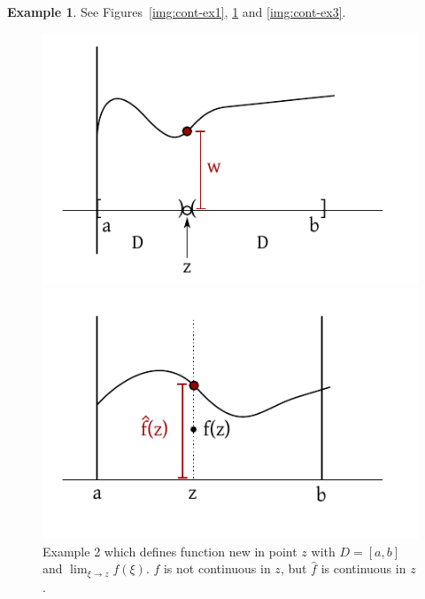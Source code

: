 \documentclass[a4paper,landscape,twocolumn]{article}
\theoremstyle{definition}
\newtheorem{ex}{Example}
\newcommand\set[1]{\left\{#1\right\}}
\begin{document}
\begin{ex}
  See Figures~\ref{img:cont-ex1}, \ref{img:cont-ex2} and \ref{img:cont-ex3}.
  \begin{figure}[p]
    \begin{center}
      \includegraphics{img/continuity_example_1.pdf}
      \caption{Example 1 with $D = [a, b] \setminus \set{z}$ and $w = \lim_{\xi \to z} f(\xi)$}
      \label{img:cont-ex1}
    \end{center}
    \begin{center}
      \includegraphics{img/continuity_example_2.pdf}
      \caption{
        Example 2 which defines function new in point $z$ with $D = [a,b]$ and $\lim_{\xi \to z} f(\xi)$.
        $f$ is not continuous in $z$, but $\hat{f}$ is continuous in $z$.
      }
      \label{img:cont-ex2}
    \end{center}
  \end{figure}
  \begin{figure}[p]
    \begin{center}

\end{center}
\end{figure}
\end{ex}
\end{document}
